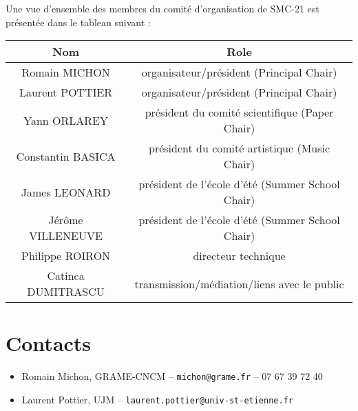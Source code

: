 \documentclass[fontsize=12pt]{scrartcl} %
\numberwithin{equation}{section} %
\numberwithin{figure}{section} %
\numberwithin{table}{section} %
\begin{document}
Une vue d'ensemble des membres du comité d'organisation de SMC-21 est présentée dans le tableau suivant :

\begin{table}[!htbp]
  \begin{center}
    \begin{tabular}{c | c}
      \textbf{Nom} & \textbf{Role} \\
      \hline
      \hline
      Romain MICHON & organisateur/président (Principal Chair) \\
      Laurent POTTIER & organisateur/président (Principal Chair) \\
      Yann ORLAREY & président du comité scientifique (Paper Chair) \\
      Constantin BASICA & président du comité artistique (Music Chair) \\
      James LEONARD & président de l'école d'été (Summer School Chair) \\
      Jérôme VILLENEUVE & président de l'école d'été (Summer School Chair) \\
      Philippe ROIRON & directeur technique \\
      Catinca DUMITRASCU & transmission/médiation/liens avec le public \\
    \end{tabular}
  \end{center}
\end{table}

\section{Contacts}

\begin{itemize}
\item Romain Michon, GRAME-CNCM -- \texttt{michon@grame.fr} -- 07 67 39 72 40
\item Laurent Pottier, UJM -- \texttt{laurent.pottier@univ-st-etienne.fr} %
\end{itemize}
\end{document}
